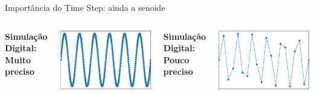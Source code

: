 \begin{frame}{\color{blue} Importância do {Time Step}: ainda a senoide}
\centering
\color{blue}

\begin{columns}


\centering
\textbf{Simulação Digital: Muito preciso}


\includegraphics[width=0.95\linewidth]{./figuras/Primeiros-Passos/Sin_discreto1_muito}


\centering
\textbf{Simulação Digital: Pouco preciso}


\includegraphics[width=0.95\linewidth]{./figuras/Primeiros-Passos/Sin_discreto1_pouco}


\end{columns}



\end{frame}







